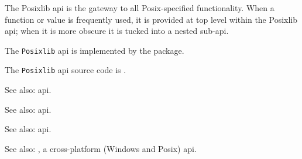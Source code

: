 The Posixlib api is the gateway to all Posix-specified functionality.  When a 
function or value is frequently used, it is provided at top level within 
the Posixlib api; when it is more obscure it is tucked into a nested sub-api.

The {\tt Posixlib} api is implemented by the  package.

The {\tt Posixlib} api source code is .

See also:   api.

See also:   api.

See also:   api.



See also: , a cross-platform (Windows and Posix) api.
